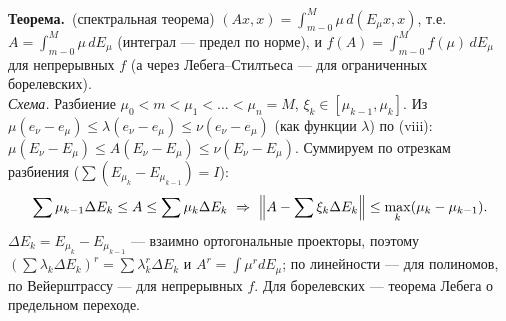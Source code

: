 \documentclass[11pt,a4paper]{article}
\newcommand{\thm}{\textbf{Теорема.}~}
\begin{document}
\thm (спектральная теорема) $(Ax,x)=\int_{m-0}^M\mu\,d(E_\mu x,x)$, т.е. $A=\int_{m-0}^M\mu\,dE_\mu$ (интеграл — предел по норме), и $f(A)=\int_{m-0}^Mf(\mu)\,dE_\mu$ для непрерывных $f$ (а через Лебега–Стилтьеса — для ограниченных борелевских).\\
\textit{Схема.} Разбиение $\mu_0<m<\mu_1<\dots<\mu_n=M$, $\xi_k\in[\mu_{k-1},\mu_k]$. Из $\mu(e_\nu-e_\mu)\le\lambda(e_\nu-e_\mu)\le\nu(e_\nu-e_\mu)$ (как функции $\lambda$) по (viii): $\mu(E_\nu-E_\mu)\le A(E_\nu-E_\mu)\le\nu(E_\nu-E_\mu)$. Суммируем по отрезкам разбиения ($\sum(E_{\mu_k}-E_{\mu_{k-1}})=I$):
\[\sum\mu_{k-1}\Delta E_k\le A\le\sum\mu_k\Delta E_k\ \Rightarrow\ \Bigl\|A-\sum\xi_k\Delta E_k\Bigr\|\le\max_k(\mu_k-\mu_{k-1}).\]
$\Delta E_k=E_{\mu_k}-E_{\mu_{k-1}}$ — взаимно ортогональные проекторы, поэтому $(\sum\lambda_k\Delta E_k)^r=\sum\lambda_k^r\Delta E_k$ и $A^r=\int\mu^rdE_\mu$; по линейности — для полиномов, по Вейерштрассу — для непрерывных $f$. Для борелевских — теорема Лебега о предельном переходе.
\end{document}
